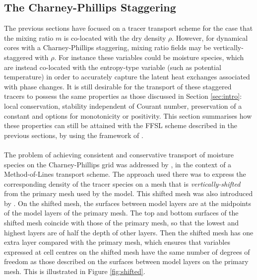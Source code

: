 \documentclass{ametsocV6.1}
\begin{document}
\subsection{The Charney-Phillips Staggering} \label{sec:charney-phillips}
The previous sections have focused on a tracer transport scheme for the case that the mixing ratio $m$ is co-located with the dry density $\rho$.
However, for dynamical cores with a Charney-Phillips staggering, mixing ratio fields may be vertically-staggered with $\rho$.
For instance these variables could be moisture species, which are instead co-located with the entropy-type variable (such as potential temperature) in order to accurately capture the latent heat exchanges associated with phase changes.
It is still desirable for the transport of these staggered tracers to possess the same properties as those discussed in Section \ref{sec:intro}: local conservation, stability independent of Courant number, preservation of a constant and options for monotonicity or positivity.
This section summarises how these properties can still be attained with the FFSL scheme described in the previous sections, by using the framework of \citet{bendall2023solution}.
\\
\\
The problem of achieving consistent and conservative transport of moisture species on the Charney-Phillips grid was addressed by \citet{bendall2023solution}, in the context of a Method-of-Lines transport scheme.
The approach used there was to express the corresponding density of the tracer species on a mesh that is \textit{vertically-shifted} from the primary mesh used by the model.
This shifted mesh was also introduced by \citet{thuburn2022numerical}.
On the shifted mesh, the surfaces between model layers are at the midpoints of the model layers of the primary mesh.
The top and bottom surfaces of the shifted mesh coincide with those of the primary mesh, so that the lowest and highest layers are of half the depth of other layers.
Then the shifted mesh has one extra layer compared with the primary mesh, which ensures that variables expressed at cell centres on the shifted mesh have the same number of degrees of freedom as those described on the surfaces between model layers on the primary mesh.
This is illustrated in Figure \ref{fig:shifted}.
\end{document}
